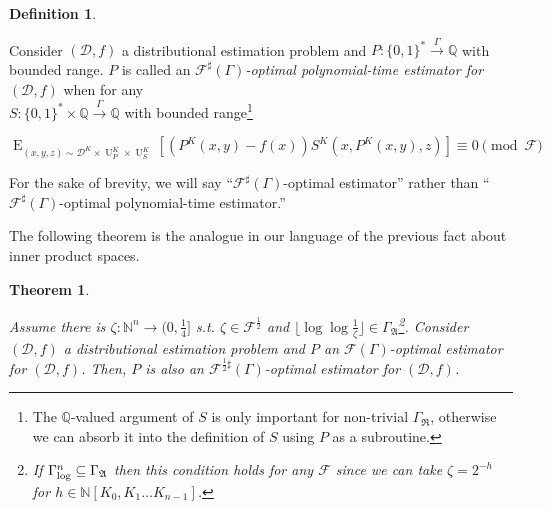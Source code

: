 \documentclass{article}
\numberwithin{equation}{section}
\theoremstyle{definition}
\newtheorem{definition}{Definition}[section]
\theoremstyle{plain}
\newtheorem{theorem}{Theorem}[section]
\newcommand{\Bool}{\{0,1\}}
\newcommand{\Words}{{\Bool^*}}
\DeclareMathOperator{\E}{E}
\DeclareMathOperator{\Un}{U}
\newcommand{\Nats}{\mathbb{N}}
\newcommand{\Rats}{\mathbb{Q}}
\newcommand{\NatPoly}{\Nats[K_0, K_1 \ldots K_{n-1}]}
\newcommand{\NatFun}{\Nats^n \rightarrow}
\newcommand{\Floor}[1]{\lfloor #1 \rfloor}
\newcommand{\Dist}{\mathcal{D}}
\newcommand{\GrowR}{\Gamma_{\mathfrak{R}}}
\newcommand{\GrowA}{\Gamma_{\mathfrak{A}}}
\newcommand{\Fall}{\mathcal{F}}
\newcommand{\EG}{\Fall(\Gamma)}
\newcommand{\ESG}{\Fall^\sharp(\Gamma)}
\newcommand{\GammaLog}{\Gamma_{\textnormal{log}}}
\newcommand{\Scheme}{\xrightarrow{\Gamma}}
\begin{document}
\begin {definition}
\label{def:obe_sharp}

Consider $(\Dist,f)$ a distributional estimation problem and ${P: \Words \Scheme \Rats}$ with bounded range. $P$ is called an \emph{$\ESG$-optimal polynomial-time estimator for $(\Dist,f)$} when for any\\ ${S: \Words \times \Rats \Scheme \Rats}$ with bounded range\footnote{The $\Rats$-valued argument of $S$ is only important for non-trivial $\GrowR$, otherwise we can absorb it into the definition of $S$ using $P$ as a subroutine.}

\begin{equation}
\label{eqn:op_sharp}
\E_{(x,y,z) \sim \Dist^{K} \times \Un_P^{K} \times \Un_S^{K}}[(P^{K}(x,y) - f(x))S^{K}(x,P^{K}(x,y),z)] \equiv 0 \pmod \Fall
\end{equation}

For the sake of brevity, we will say \enquote{${\ESG}$-optimal estimator} rather than \enquote{${\ESG}$-optimal polynomial-time estimator.}

\end {definition}

The following theorem is the analogue in our language of the previous fact about inner product spaces.

\begin{theorem}
\label{thm:ort}

Assume there is $\zeta: \NatFun (0,\frac{1}{4}]$ s.t. $\zeta \in \Fall^{\frac{1}{2}}$ and ${\Floor{\log \log \frac{1}{\zeta}} \in \GrowA}$\footnote{If $\GammaLog^n \subseteq \GrowA$ then this condition holds for any $\Fall$ since we can take $\zeta = 2^{-h}$ for $h \in \NatPoly$.}. Consider $(\Dist,f)$ a distributional estimation problem and $P$ an $\EG$-optimal estimator for $(\Dist,f)$. Then, $P$ is also an $\Fall^{\frac{1}{2}\sharp}(\Gamma)$-optimal estimator for $(\Dist,f)$.

\end{theorem}
\end{document}
